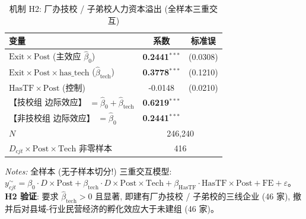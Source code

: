 \begin{table}[htbp]
\centering
\small
\caption{机制 H2: 厂办技校 / 子弟校人力资本溢出 (全样本三重交互)}
\label{tab:h2}
\begin{tabular}{lcc}
\hline\hline
变量 & 系数 & 标准误 \\
\hline
$\mathrm{Exit}\times\mathrm{Post}$ (主效应 $\hat{\beta}_0$) & \textbf{0.2441}$^{***}$ & (0.0308) \\
$\mathrm{Exit}\times\mathrm{Post}\times\mathrm{has\_tech}$ ($\hat{\beta}_{\mathrm{tech}}$) & \textbf{0.3778}$^{***}$ & (0.1210) \\
$\mathrm{HasTF}\times\mathrm{Post}$ (控制) & -0.0148 & (0.0210) \\
\hline
【技校组 边际效应】 $= \hat{\beta}_0 + \hat{\beta}_{\mathrm{tech}}$ & \textbf{0.6219}$^{***}$ \\
【非技校组 边际效应】 $= \hat{\beta}_0$ & \textbf{0.2441}$^{***}$ \\
\hline
$N$ & \multicolumn{2}{c}{246,240} \\
$D_{cjt}\times\mathrm{Post}\times\mathrm{Tech}$ 非零样本 & \multicolumn{2}{c}{416} \\
\hline\hline
\end{tabular}
\begin{flushleft}\footnotesize
\textit{Notes:} 全样本 (无子样本切分!) 三重交互模型: $y^{\sim}_{cjt}=\beta_0 \cdot D\times\mathrm{Post}+\beta_{\mathrm{tech}}\cdot D\times\mathrm{Post}\times\mathrm{Tech}+\beta_{\mathrm{HasTF}}\cdot\mathrm{HasTF}\times\mathrm{Post}+\mathrm{FE}+\varepsilon$。\textbf{H2 验证}: 要求 $\hat{\beta}_{\mathrm{tech}}>0$ 且显著, 即建有厂办技校 / 子弟校的三线企业 (46 家), 撤并后对县域-行业民营经济的孵化效应大于未建组 (46 家)。
\end{flushleft}
\end{table}
